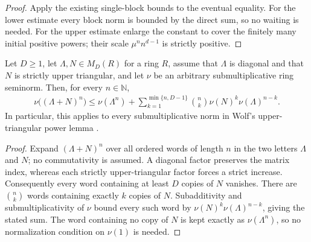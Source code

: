 \begin{proof}
    \leanok
    Apply the existing single-block bounds to the eventual equality.
    For the lower estimate every block norm is bounded by the direct sum,
    so no waiting is needed. For the upper estimate enlarge the constant
    to cover the finitely many initial positive powers; their scale
    $\mu^n n^{d-1}$ is strictly positive.
\end{proof}

\begin{theorem}
    \label{thm:wolf_upper_triangular_word_bound}
    \leanok
    Let $D\ge 1$, let $\Lambda,N\in M_D(R)$ for a ring $R$, assume that $\Lambda$ is
    diagonal and that $N$ is strictly upper triangular, and let $\nu$ be an
    arbitrary submultiplicative ring seminorm.  Then, for every
    $n\in\mathbb N$,
    \begin{align}
      \nu\bigl((\Lambda+N)^n\bigr)
      \le \nu(\Lambda^n)
      +\sum_{k=1}^{\min\{n,D-1\}}
        \binom{n}{k}\nu(N)^k\nu(\Lambda)^{n-k}.
    \end{align}
    In particular, this applies to every submultiplicative norm in Wolf's
    upper-triangular power lemma
    \cite[Chapter~8, Equation~(8.105)]{Wolf2012Quantum}.
\end{theorem}

\begin{proof}
    \leanok
    Expand $(\Lambda+N)^n$ over all ordered words of length $n$ in the two
    letters $\Lambda$ and $N$; no commutativity is assumed.  A diagonal factor
    preserves the matrix index, whereas each strictly upper-triangular factor
    forces a strict increase.  Consequently every word containing at least
    $D$ copies of $N$ vanishes.  There are $\binom{n}{k}$ words containing
    exactly $k$ copies of $N$.  Subadditivity and submultiplicativity of $\nu$
    bound every such word by $\nu(N)^k\nu(\Lambda)^{n-k}$, giving the stated
    sum.  The word containing no copy of $N$ is kept exactly as
    $\nu(\Lambda^n)$, so no normalization condition on $\nu(1)$ is needed.
\end{proof}

